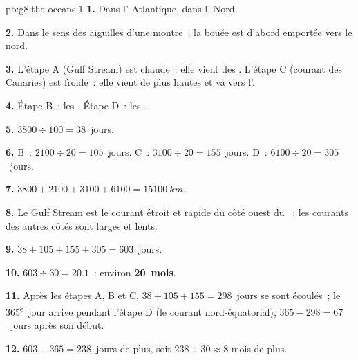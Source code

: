 \begin{solution}{pb:g8:the-oceans:1}
\textbf{1.} Dans l' Atlantique, dans l' Nord.

\textbf{2.} Dans le sens des aiguilles d'une montre~; la bouée est d'abord emportée vers le nord.

\textbf{3.} L'étape A (Gulf Stream) est chaude~: elle vient des .
L'étape C (courant des Canaries) est froide~: elle vient de plus hautes
 et va vers l'.

\textbf{4.} Étape B~: les . Étape D~: les .

\textbf{5.} $3800 \div 100 = 38$~jours.

\textbf{6.} B~: $2100 \div 20 = 105$~jours. C~: $3100 \div 20 = 155$~jours.
D~: $6100 \div 20 = 305$~jours.

\textbf{7.} $3800 + 2100 + 3100 + 6100 = \qty{15100}{km}$.

\textbf{8.} Le Gulf Stream est le courant étroit et rapide du côté ouest du
~; les courants des autres côtés sont larges et lents.

\textbf{9.} $38 + 105 + 155 + 305 = 603$~jours.

\textbf{10.} $603 \div 30 = 20.1$~: environ \textbf{20~mois}.

\textbf{11.} Après les étapes A, B et C, $38 + 105 + 155 = 298$~jours se
sont écoulés~; le 365\textsuperscript{e}~jour arrive pendant l'étape D (le
courant nord-équatorial), $365 -
298 = 67$~jours après son début.

\textbf{12.} $603 - 365 = 238$~jours de plus, soit $238 \div 30 \approx 8$
mois de plus.
\end{solution}
